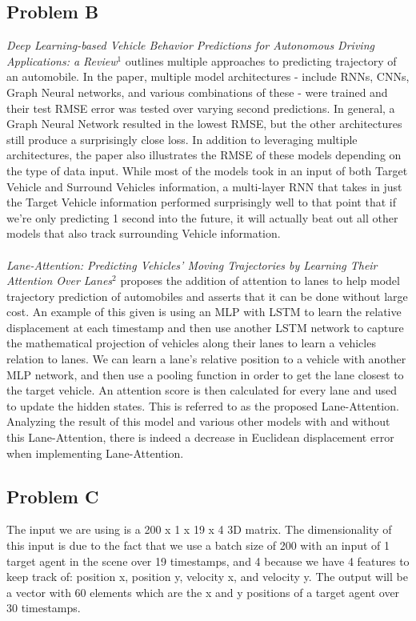 \documentclass{article}
\begin{document}
\subsection{Problem B}
\textit{Deep Learning-based Vehicle Behavior Predictions for Autonomous Driving Applications: a Review}$^{1}$ outlines multiple approaches to predicting trajectory of an automobile. In the paper, multiple model architectures - include RNNs, CNNs, Graph Neural networks, and various combinations of these - were trained and their test RMSE error was tested over varying second predictions. In general, a Graph Neural Network resulted in the lowest RMSE, but the other architectures still produce a surprisingly close loss. In addition to leveraging multiple architectures, the paper also illustrates the RMSE of these models depending on the type of data input. While most of the models took in an input of both Target Vehicle and Surround Vehicles information, a multi-layer RNN that takes in just the Target Vehicle information performed surprisingly well to that point that if we're only predicting 1 second into the future, it will actually beat out all other models that also track surrounding Vehicle information. \\ \\ 
\textit{Lane-Attention: Predicting Vehicles’ Moving Trajectories by Learning Their Attention Over Lanes}$^{2}$
 proposes the addition of attention to lanes to help model trajectory prediction of automobiles and asserts that it can be done without large cost. An example of this given is using an MLP with LSTM to learn the relative displacement at each timestamp and then use another LSTM network to capture the mathematical projection of vehicles along their lanes to learn a vehicles relation to lanes. We can learn a lane's relative position to a vehicle with another MLP network, and then use a pooling function in order to get the lane closest to the target vehicle. An attention score is then calculated for every lane and used to update the hidden states. This is referred to as the proposed Lane-Attention. Analyzing the result of this model and various other models with and without this Lane-Attention, there is indeed a decrease in Euclidean displacement error when implementing Lane-Attention.

\subsection{Problem C}
The input we are using is a 200 x 1 x 19 x 4 3D matrix. The dimensionality of this input is due to the fact that we use a batch size of 200 with an input of 1 target agent in the scene over 19 timestamps, and 4 because we have 4 features to keep track of: position x, position y, velocity x, and velocity y. The output will be a vector with 60 elements which are the x and y positions of a target agent over 30 timestamps.  
\end{document}
